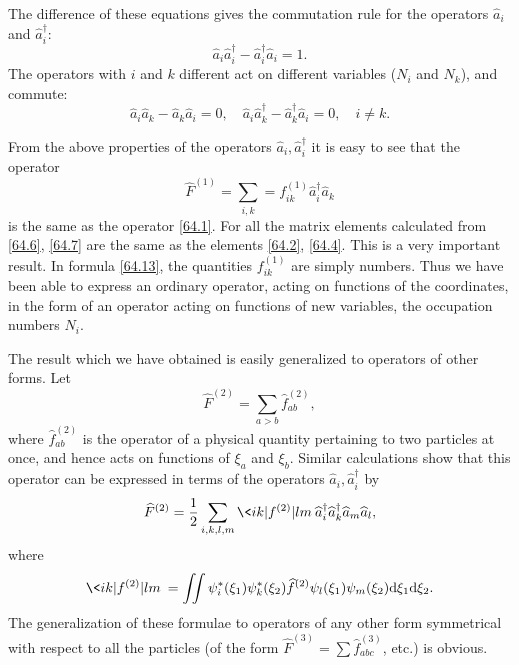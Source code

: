 The difference of these equations gives the commutation rule for the operators $\hat{a}_i$ and $ \hat{a}_i^\dagger $:
\begin{equation}\label{64.11}
\hat{a}_i\hat{a}_i^\dagger-\hat{a}_i^\dagger\hat{a}_i=1.
\end{equation}
The operators with $ i $ and $ k $ different act on different variables ($ N_i $ and $ N_k $), and commute:
\begin{equation}\label{64.12}
\hat{a}_i\hat{a}_k-\hat{a}_k\hat{a}_i=0,\quad\hat{a}_i\hat{a}_k^\dagger-\hat{a}_k^\dagger\hat{a}_i=0,\quad i\ne k.
\end{equation}



From the above properties of the operators $ \hat{a}_i, \hat{a}_i^\dagger $ it is easy to see that the operator
\begin{equation}\label{64.13}
\hat{F}^{(1)}=\sum_{i,k}=f_{ik}^{(1)}\hat{a}_i^\dagger\hat{a}_k
\end{equation}
is the same as the operator \eqref{64.1}. For all the matrix elements calculated from \eqref{64.6}, \eqref{64.7} are the same as the elements \eqref{64.2}, \eqref{64.4}. This is a very important result. In formula \eqref{64.13}, the quantities $ f^{(1)}_{ik} $ are simply numbers. Thus we have been able to express an ordinary operator, acting on functions of the coordinates, in the form of an operator acting on functions of new variables, the occupation numbers $ N_i $.

The result which we have obtained is easily generalized to operators of other forms. Let
\begin{equation}\label{64.14}
\hat{F}^{(2)}=\sum_{a>b}\hat{f}_{ab}^{(2)},
\end{equation}
where $ \hat{f}_{ab}^{(2)} $ is the operator of a physical quantity pertaining to two particles at once, and hence acts on functions of $\xi_a$ and $\xi_b$. Similar calculations show that this operator can be expressed in terms of the operators $ \hat{a}_i, \hat{a}_i^\dagger $ by
\begin{equation}\label{64.15}
\hat{F}^{(2)}=\frac{1}{2}\sum_{i,k,l,m}\< ik|f^{(2)}|lm\>\hat{a}_i^\dagger\hat{a}_k^\dagger\hat{a}_m\hat{a}_l,
\end{equation}
where
\[ \< ik|f^{(2)}|lm\>=\iint\psi_i^*(\xi_1)\psi_k^*(\xi_2)\hat{f}^{(2)}\psi_l(\xi_1)\psi_m(\xi_2)\d\xi_1\d\xi_2. \]
The generalization of these formulae to operators of any other form symmetrical with respect to all the particles (of the form $ \hat{F}^{(3)} = \sum\hat{f}^{(3)}_{abc} $, etc.) is obvious.


